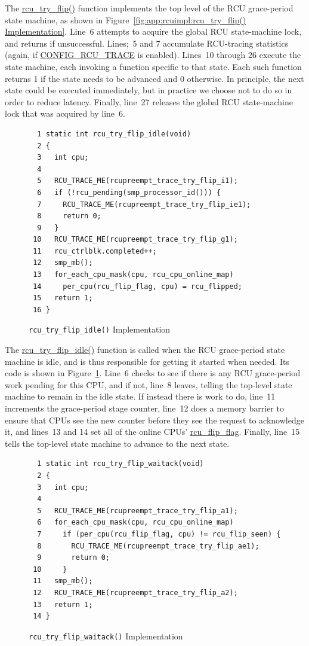 The \url{rcu_try_flip()} function implements the top level of
the RCU grace-period state machine, as shown in
Figure~\ref{fig:app:rcuimpl:rcu_try_flip() Implementation}.
Line~6 attempts to acquire the global RCU state-machine lock,
and returns if unsuccessful.
Lines;~5 and 7 accumulate RCU-tracing statistics (again, if
\url{CONFIG_RCU_TRACE} is enabled).
Lines~10 through 26 execute the state machine,
each invoking a function specific to that state.
Each such function returns 1 if the state needs to be advanced and
0 otherwise.
In principle, the next state could be executed immediately,
but in practice we choose not to do so in order to reduce latency.
Finally, line~27 releases the global RCU state-machine lock
that was acquired by line~6.

\begin{figure}[tbp]
{ \scriptsize
\begin{verbatim}
  1 static int rcu_try_flip_idle(void)
  2 {
  3   int cpu;
  4
  5   RCU_TRACE_ME(rcupreempt_trace_try_flip_i1);
  6   if (!rcu_pending(smp_processor_id())) {
  7     RCU_TRACE_ME(rcupreempt_trace_try_flip_ie1);
  8     return 0;
  9   }
 10   RCU_TRACE_ME(rcupreempt_trace_try_flip_g1);
 11   rcu_ctrlblk.completed++;
 12   smp_mb();
 13   for_each_cpu_mask(cpu, rcu_cpu_online_map)
 14     per_cpu(rcu_flip_flag, cpu) = rcu_flipped;
 15   return 1;
 16 }
\end{verbatim}
}
\caption{{\tt rcu\_try\_flip\_idle()} Implementation}
\label{fig:app:rcuimpl:rcu_try_flip_idle() Implementation}
\end{figure}

The \url{rcu_try_flip_idle()} function is called when the
RCU grace-period state machine is idle, and is thus responsible for
getting it started when needed.
Its code is shown in
Figure~\ref{fig:app:rcuimpl:rcu_try_flip_idle() Implementation}.
Line~6 checks to see if there is any RCU grace-period work
pending for this CPU, and if not, line~8 leaves, telling
the top-level state machine to remain in the idle state.
If instead there is work to do, line~11 increments the
grace-period stage counter, line~12 does a memory barrier
to ensure that CPUs see the new counter before they see the
request to acknowledge it, and lines~13 and 14 set all of
the online CPUs' \url{rcu_flip_flag}.
Finally, line~15 tells the top-level state machine to
advance to the next state.

\begin{figure}[tbp]
{ \scriptsize
\begin{verbatim}
  1 static int rcu_try_flip_waitack(void)
  2 {
  3   int cpu;
  4
  5   RCU_TRACE_ME(rcupreempt_trace_try_flip_a1);
  6   for_each_cpu_mask(cpu, rcu_cpu_online_map)
  7     if (per_cpu(rcu_flip_flag, cpu) != rcu_flip_seen) {
  8       RCU_TRACE_ME(rcupreempt_trace_try_flip_ae1);
  9       return 0;
 10     }
 11   smp_mb();
 12   RCU_TRACE_ME(rcupreempt_trace_try_flip_a2);
 13   return 1;
 14 }
\end{verbatim}
}
\caption{{\tt rcu\_try\_flip\_waitack()} Implementation}
\label{fig:app:rcuimpl:rcu_try_flip_waitack() Implementation}
\end{figure}

